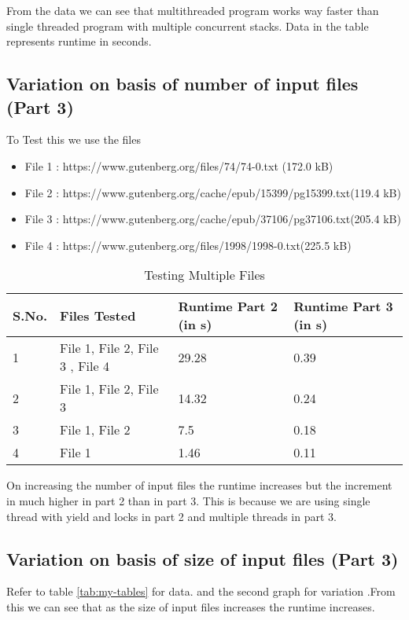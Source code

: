 \documentclass{article}
\begin{document}
\bigbreak
\bigbreak

From the data we can see that multithreaded program works way faster than single threaded program with multiple concurrent stacks. Data in the table represents runtime in seconds.
\subsection*{Variation on basis of number of input files (Part 3)}


To Test this we use the files
\begin{itemize}
    \item File 1 : https://www.gutenberg.org/files/74/74-0.txt (172.0 kB) 
    \item File 2 : https://www.gutenberg.org/cache/epub/15399/pg15399.txt(119.4 kB)
    \item File 3 : https://www.gutenberg.org/cache/epub/37106/pg37106.txt(205.4 kB)
    \item File 4 : https://www.gutenberg.org/files/1998/1998-0.txt(225.5 kB)
\end{itemize}

\begin{table}[h]
    \centering
    \begin{tabular}{|l|l|l|l|}
    \hline
    S.No. & Files Tested                    & Runtime Part 2 (in s) & Runtime Part 3 (in s) \\ \hline
    1     & File 1, File 2, File 3 , File 4 & 29.28                 & 0.39                  \\ \hline
    2     & File 1, File 2, File 3          & 14.32                 & 0.24                  \\ \hline
    3     & File 1, File 2                  & 7.5                   & 0.18                  \\ \hline
    4     & File 1                          & 1.46                  & 0.11                  \\ \hline
    \end{tabular}
    \caption{Testing Multiple Files}
    \label{tab:my-table}
    \end{table}

On increasing the number of input files the runtime increases but the increment in much higher in part 2 than in part 3. This is because we are using single thread with yield and locks in part 2 and multiple threads in part 3.

\subsection*{Variation on basis of size of input files (Part 3)}
Refer to table \ref{tab:my-tables} for data. and the second graph  for variation .From this we can see that as the size of input files increases the runtime increases. 
\end{document}
